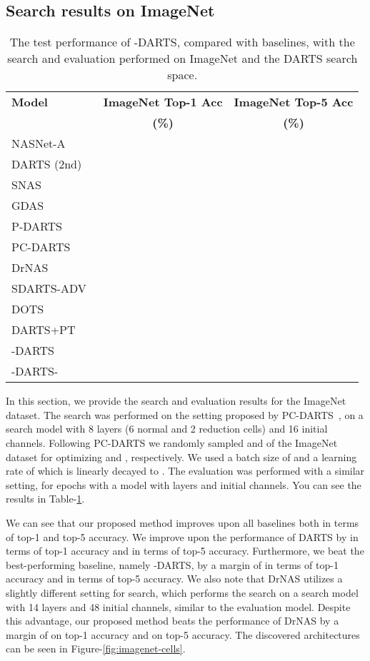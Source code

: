 \documentclass{article} \usepackage{fancyhdr, iclr2023_conference, times}
\newcommand{\mydarts}{-DARTS\xspace}
\begin{document}
\subsection{Search results on ImageNet}
\label{appndx:imagenet-search}
\begin{table}[t]
\centering
\caption{The test performance of \mydarts, compared with baselines, with the search and evaluation performed on ImageNet and the DARTS search space.} 
\label{table:imagenet-search}
\begin{tabular}{l|c|c}
\textbf{Model} &\textbf{ImageNet Top-1 Acc} & \textbf{ImageNet Top-5 Acc} \\ 
& \textbf{(\%)} & \textbf{(\%)} \\\hline
NASNet-A~\citep{DBLP:conf/cvpr/ZophVSL18} &	 &	\\
DARTS (2nd)~\citep{DBLP:conf/iclr/LiuSY19}	&  &	\\
SNAS~\citep{DBLP:conf/iclr/XieZLL19} &	 &	 \\
GDAS~\citep{DBLP:conf/cvpr/DongY19} &	 &	 \\
P-DARTS~\citep{DBLP:journals/ijcv/ChenXWT21} &	 &	 \\
PC-DARTS~\citep{DBLP:conf/iclr/XuX0CQ0X20} &	 &	 \\
DrNAS~\citep{DBLP:conf/iclr/ChenWCTH21} &	 &	\\
SDARTS-ADV~\citep{DBLP:conf/icml/ChenH20} &	 &	\\
DOTS~\citep{DBLP:conf/cvpr/GuW0YWLC21} &	 &	 \\
DARTS+PT~\citep{DBLP:conf/iclr/WangCCTH21} &	 &	 \\
-DARTS~\citep{DBLP:journals/corr/abs-2203-01665} &	 &	 \\\hline
\mydarts- &	 &	

\end{tabular}
\end{table}
\par In this section, we provide the search and evaluation results for the ImageNet dataset. The search was performed on the setting proposed by PC-DARTS~\citep{DBLP:conf/iclr/XuX0CQ0X20}, on a search model with 8 layers (6 normal and 2 reduction cells) and 16 initial channels. Following PC-DARTS we randomly sampled  and  of the ImageNet dataset for optimizing 
 and , respectively. We used a batch size of  and a learning rate of  which is linearly decayed to . The evaluation was performed with a similar setting, for  epochs with a model with  layers and  initial channels. You can see the results in Table-\ref{table:imagenet-search}.
\par We can see that our proposed method improves upon all baselines both in terms of top-1 and top-5 accuracy. We improve upon the performance of DARTS by  in terms of top-1 accuracy and  in terms of top-5 accuracy. Furthermore, we beat the best-performing baseline, namely -DARTS, by a margin of  in terms of top-1 accuracy and  in terms of top-5 accuracy. We also note that DrNAS utilizes a slightly different setting for search, which performs the search on a search model with 14 layers and 48 initial channels, similar to the evaluation model. Despite this advantage, our proposed method beats the performance of DrNAS by a margin of  on top-1 accuracy and  on top-5 accuracy. The discovered architectures can be seen in Figure-\ref{fig:imagenet-cells}.
\end{document}
